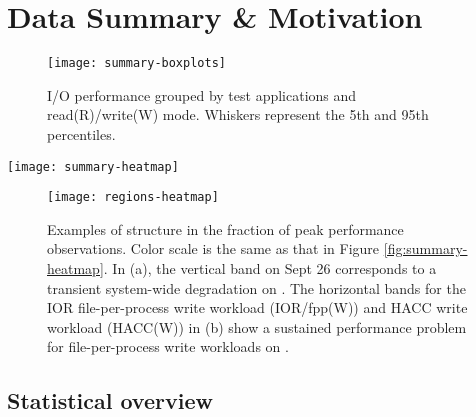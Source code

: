 \section{Data Summary \& Motivation}  \label{sec:features}

\begin{figure}
    \centering
    \texttt{[image: summary-boxplots]}
    \vspace{-.15in}
    \caption{I/O performance grouped by test applications and read(R)/write(W) mode.  Whiskers represent the 5th and 95th percentiles.}
    \label{fig:summary-boxplots}
\end{figure}


\begin{figure*}
    \centering
    \texttt{[image: summary-heatmap]}
    \vspace{-.2in}
    \caption{Performance of daily benchmarks normalized to each benchmark's peak observed performance on the specified storage system.  The y-axis labels show combinations of system, I/O motif, and mode (Read/Write).  Grey represents days on which no observations were made.  The two regions highlighted in green boxes are expanded upon in Figure \ref{fig:regions-heatmap}.}
    \label{fig:summary-heatmap}
\end{figure*}

\begin{figure}
    \centering
    \texttt{[image: regions-heatmap]}
    \vspace{-.2in}
    \caption{Examples of structure in the fraction of peak performance observations.  Color scale is the same as that in Figure \ref{fig:summary-heatmap}.  In (a), the vertical band on Sept 26 corresponds to a transient system-wide degradation on \mira.  The horizontal bands for the IOR file-per-process write workload (IOR/fpp(W)) and HACC write workload (HACC(W)) in (b) show a sustained performance problem for file-per-process write workloads on \cori.}
    \label{fig:regions-heatmap}
\end{figure}

\subsection{Statistical overview} \label{sec:features/summary}



